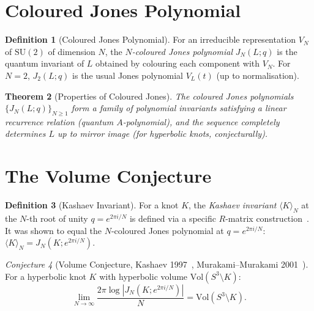 \documentclass[12pt,a4paper]{amsart}
\newtheorem{theorem}{Theorem}[section]
\theoremstyle{definition}
\newtheorem{definition}[theorem]{Definition}
\theoremstyle{remark}
\newtheorem{conjecture}[theorem]{Conjecture}
\begin{document}
\section{Coloured Jones Polynomial}

\begin{definition}[Coloured Jones Polynomial]
For an irreducible representation $V_N$ of $\mathrm{SU}(2)$ of dimension $N$,
the \emph{$N$-coloured Jones polynomial} $J_N(L; q)$ is the quantum invariant
of $L$ obtained by colouring each component with $V_N$.
For $N=2$, $J_2(L;q)$ is the usual Jones polynomial $V_L(t)$ (up to
normalisation).
\end{definition}

\begin{theorem}[Properties of Coloured Jones]
The coloured Jones polynomials $\{J_N(L;q)\}_{N \geq 1}$ form a
family of polynomial invariants satisfying a linear recurrence relation
(quantum $A$-polynomial), and the sequence completely determines $L$ up
to mirror image (for hyperbolic knots, conjecturally).
\end{theorem}

\section{The Volume Conjecture}

\begin{definition}[Kashaev Invariant]
For a knot $K$, the \emph{Kashaev invariant} $\langle K \rangle_N$ at the
$N$-th root of unity $q = e^{2\pi i/N}$ is defined via a specific
$R$-matrix construction~\cite{Kashaev1997}. It was shown to equal the
$N$-coloured Jones polynomial at $q = e^{2\pi i/N}$:
$\langle K \rangle_N = J_N(K; e^{2\pi i/N})$.
\end{definition}

\begin{conjecture}[Volume Conjecture, Kashaev 1997~\cite{Kashaev1997}, Murakami--Murakami 2001~\cite{MurakamiMurakami2001}]
\label{conj:Volume}
For a hyperbolic knot $K$ with hyperbolic volume $\mathrm{Vol}(S^3 \setminus K)$:
\[
    \lim_{N \to \infty} \frac{2\pi \log |J_N(K; e^{2\pi i/N})|}{N}
    = \mathrm{Vol}(S^3 \setminus K).
\]
\end{conjecture}
\end{document}

